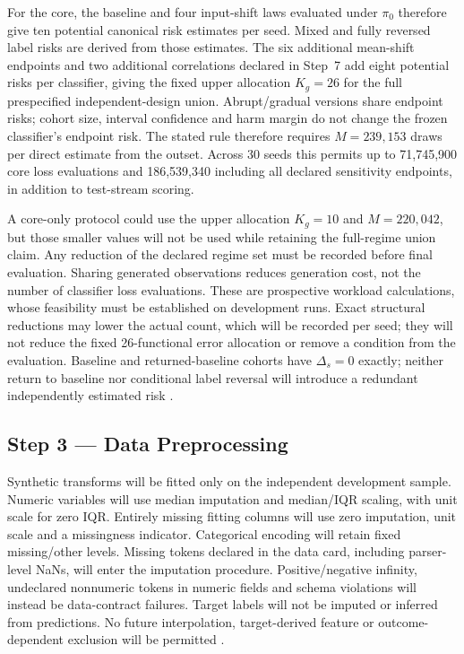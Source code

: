\documentclass[11pt,a4paper]{article}
\begin{document}
For the core, the baseline and four input-shift laws evaluated under
$\pi_0$ therefore give ten potential canonical risk estimates per seed.
Mixed and fully reversed label risks are derived from those estimates.
The six additional
mean-shift endpoints and two additional correlations declared in Step~7 add
eight potential risks per classifier, giving the fixed upper allocation
$K_g=26$ for the full prespecified
independent-design union. Abrupt/gradual versions share endpoint risks;
cohort size, interval confidence and harm margin do not change the frozen
classifier's endpoint risk. The stated rule therefore requires
$M=239{,}153$ draws per direct estimate from the outset. Across 30 seeds this
permits up to 71,745,900 core loss evaluations and 186,539,340 including all declared
sensitivity endpoints, in addition to test-stream scoring.

A core-only protocol could use the upper allocation $K_g=10$ and
$M=220{,}042$, but those smaller
values will not be used while retaining the full-regime union claim.
Any reduction of the declared regime set must be recorded before final
evaluation. Sharing generated observations reduces generation cost, not the
number of classifier loss evaluations. These are prospective workload
calculations, whose feasibility must be established on development runs.
Exact structural reductions may lower the actual count, which will be
recorded per seed; they will not reduce the fixed 26-functional error
allocation or remove a condition from the evaluation.
Baseline and returned-baseline cohorts have $\Delta_s=0$ exactly; neither
return to baseline nor conditional label reversal will introduce a redundant
independently estimated risk \cite{hoeffding,souza}.

\subsection*{Step 3 --- Data Preprocessing}
Synthetic transforms will be fitted only on the independent development sample.
Numeric variables will use median imputation and median/IQR scaling, with unit
scale for zero IQR. Entirely missing fitting columns will use zero imputation,
unit scale and a missingness indicator. Categorical encoding will retain fixed
missing/other levels. Missing tokens declared in the data card, including
parser-level NaNs, will enter the imputation procedure. Positive/negative
infinity, undeclared nonnumeric tokens in numeric fields and schema violations will instead be
data-contract failures. Target labels will not be imputed or inferred from
predictions. No future interpolation, target-derived feature or
outcome-dependent exclusion will be permitted \cite{souza}.
\end{document}
